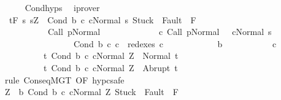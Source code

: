 \begin{isabellebody}
\ \ \ \ \isamarkupfalse%
\ Cond{\isachardot}hyps\ \isamarkupfalse%
\ iprover\isanewline
\ \ \isamarkupfalse%
\ \isanewline
\ \ {\isachardoublequoteopen}{\isasymGamma}{\isacharcomma}{\isasymTheta}{\isasymturnstile}\isactrlsub t\isactrlbsub {\isacharslash}F\isactrlesub \ {\isacharparenleft}{\isacharbraceleft}s{\isachardot}\ s{\isacharequal}Z\ {\isasymand}\ {\isasymGamma}{\isasymturnstile}{\isasymlangle}Cond\ b\ c{}\ c{}{\isacharcomma}Normal\ s{\isasymrangle}\ {\isasymRightarrow}{\isasymnotin}{\isacharparenleft}{\isacharbraceleft}Stuck{\isacharbraceright}\ {\isasymunion}\ Fault\ {\isacharbackquote}\ {\isacharparenleft}{\isacharminus}F{\isacharparenright}{\isacharparenright}\ {\isasymand}\ \isanewline
\ \ \ \ \ \ \ \ \ \ \ {\isasymGamma}{\isasymturnstile}Call\ p{\isasymdown}Normal\ {\isasymsigma}\ {\isasymand}\isanewline
\ \ \ \ \ \ \ \ \ \ \ {\isacharparenleft}{\isasymexists}c{\isacharprime}{\isachardot}\ {\isasymGamma}{\isasymturnstile}{\isacharparenleft}Call\ p{\isacharcomma}Normal\ {\isasymsigma}{\isacharparenright}\ {\isasymrightarrow}\isactrlsup {\isacharplus}\ {\isacharparenleft}c{\isacharprime}{\isacharcomma}Normal\ s{\isacharparenright}\ {\isasymand}\ \isanewline
\ \ \ \ \ \ \ \ \ \ \ \ \ \ \ \ \ Cond\ b\ c{}\ c{}\ {\isasymin}\ redexes\ c{\isacharprime}{\isacharparenright}{\isacharbraceright}\isanewline
\ \ \ \ \ \ \ \ \ \ \ {\isasyminter}\ b{\isacharparenright}\isanewline
\ \ \ \ \ \ \ \ \ \ \ c{}\ \isanewline
\ \ \ \ \ \ \ \ \ \ {\isacharbraceleft}t{\isachardot}\ {\isasymGamma}{\isasymturnstile}{\isasymlangle}Cond\ b\ c{}\ c{}{\isacharcomma}Normal\ Z{\isasymrangle}\ {\isasymRightarrow}\ Normal\ t{\isacharbraceright}{\isacharcomma}\isanewline
\ \ \ \ \ \ \ \ \ \ {\isacharbraceleft}t{\isachardot}\ {\isasymGamma}{\isasymturnstile}{\isasymlangle}Cond\ b\ c{}\ c{}{\isacharcomma}Normal\ Z{\isasymrangle}\ {\isasymRightarrow}\ Abrupt\ t{\isacharbraceright}{\isachardoublequoteclose}\isanewline
\ \ \isamarkupfalse%
\ {\isacharparenleft}rule\ ConseqMGT\ {\isacharbrackleft}OF\ hyp{\isacharunderscore}c{}{\isacharbrackright}{\isacharcomma}safe{\isacharparenright}\isanewline
\ \ \ \ \isamarkupfalse%
\ {\isachardoublequoteopen}Z\ {\isasymin}\ b{\isachardoublequoteclose}\ {\isachardoublequoteopen}{\isasymGamma}{\isasymturnstile}{\isasymlangle}Cond\ b\ c{}\ c{}{\isacharcomma}Normal\ Z{\isasymrangle}\ {\isasymRightarrow}{\isasymnotin}{\isacharparenleft}{\isacharbraceleft}Stuck{\isacharbraceright}\ {\isasymunion}\ Fault\ {\isacharbackquote}\ {\isacharparenleft}{\isacharminus}F{\isacharparenright}{\isacharparenright}{\isachardoublequoteclose}\isanewline

\end{isabellebody}
